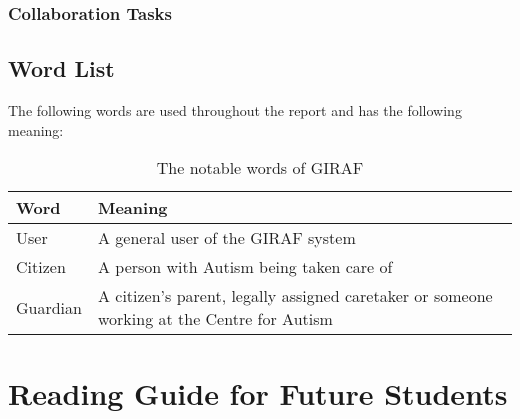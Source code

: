 \subsubsection{Collaboration Tasks}


\subsection{Word List}
The following words are used throughout the report and has the following
meaning:

\begin{table}[H]
\centering

\begin{tabular}{|l|p{6cm}|}
\hline
\textbf{Word} & \textbf{Meaning} \\ \hline
User & A general user of the GIRAF system \\ \hline
Citizen & A person with Autism being taken care of \\ \hline
Guardian & A citizen's parent, legally assigned caretaker or someone working
at the Centre for Autism\\ \hline
\end{tabular}
\caption{The notable words of GIRAF}
\end{table}


\section{Reading Guide for Future Students}



